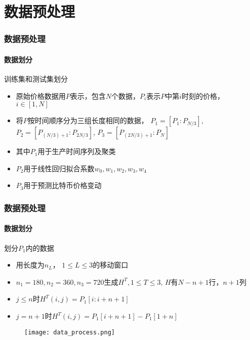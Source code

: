 \documentclass[unknownkeysallowed]{beamer}
\begin{document}
    \section{数据预处理}
    \begin{frame}
      \frametitle{数据预处理}
      \framesubtitle{数据划分}
      \begin{block}{训练集和测试集划分}
        \begin{itemize}
          \item 原始价格数据用$P$表示，包含$N$个数据，$P_{i}$表示$P$中第$i$时刻的价格， $i\in [1, N]$
          \item 将$P$按时间顺序分为三组长度相同的数据， $P_1 = [P_1: P_{N/3}]$, $P_2 = [P_{(N/3) + 1}: P_{2N/3}]$, $P_3 = [P_{(2N/3) + 1}: P_{N}]$
          \item 其中$P_1$用于生产时间序列及聚类
          \item $P_2$用于线性回归拟合系数$w_0, w_1, w_2, w_3, w_4$
          \item $P_3$用于预测比特币价格变动
        \end{itemize}
      \end{block}
    \end{frame}
    


\begin{frame}
  \frametitle{数据预处理}
  \framesubtitle{数据划分}
  \begin{block}{划分$P_1$内的数据}
    \begin{itemize}
      \item 用长度为$n_L$， $1\leq L\leq 3$的移动窗口
      \item $n_1 = 180, n_2 = 360, n_3 = 720$生成$H^T, 1\leq T\leq 3$, $H$有$N - n + 1$行，$n +1$列
      \item $j\leq n$时$H^T(i, j) = P_1[i : i + n + 1]$
      \item $j = n + 1$时$H^T(i, j) = P_1[i + n +1] - P_1[1 + n]$
    \end{itemize}
  \end{block}

  \begin{figure}
    \centering
    \texttt{[image: data\_process.png]}
  \end{figure}

\end{frame}
\end{document}
